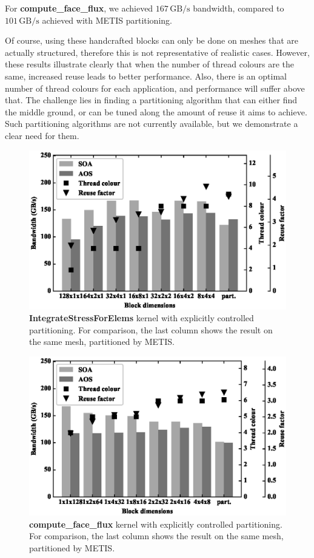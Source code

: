 For \textbf{compute\_face\_flux}, we achieved $167\,\text{GB/s}$ bandwidth,
compared to $101\,\text{GB/s}$ achieved with METIS partitioning.

Of course, using these handcrafted blocks can only be done on meshes that are actually structured, therefore this is not representative of realistic cases. However, these results illustrate clearly that when
the number of thread colours are the same, increased reuse leads to better
performance. Also, there is an optimal number of thread colours for each
application, and performance will suffer above that. The challenge lies in
finding a partitioning algorithm that can either find the middle ground, or can
be tuned along the amount of reuse it aims to achieve. Such partitioning algorithms are not currently available, but we demonstrate a clear need for them.

\begin{figure}[Htbp]
  \centering
  \includegraphics[width=12cm]{fig/lulesh_block.eps}
  \caption{\textbf{IntegrateStressForElems} kernel with explicitly controlled
  partitioning. For comparison, the last column shows the result on the same
  mesh, partitioned by METIS.}
  \label{fig:lulesh_block}
\end{figure}

\begin{figure}[Htbp]
  \centering
  \includegraphics[width=12cm]{fig/mini_aero_block.eps}
  \caption{\textbf{compute\_face\_flux} kernel with explicitly controlled
  partitioning. For comparison, the last column shows the result on the same
  mesh, partitioned by METIS.}
  \label{fig:mini_aero_block}
\end{figure}

